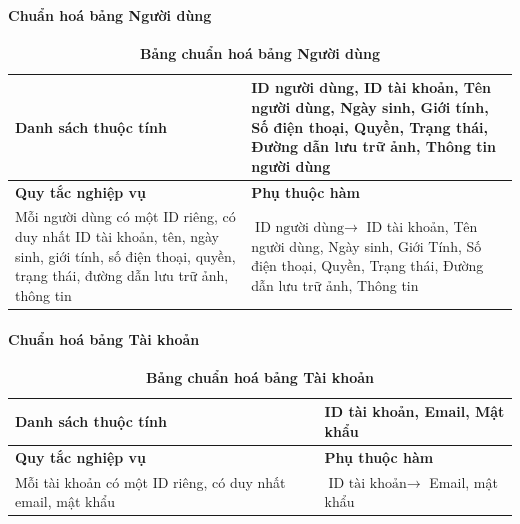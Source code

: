 \paragraph{Chuẩn hoá bảng Người dùng}
\mbox{}
\begin{table}[H]
  \caption{\bfseries \fontsize{12pt}{0pt}\selectfont Bảng chuẩn hoá bảng Người dùng}
  \centering
  \begin{tabularx}{0.9\textwidth}{|X|X|}
    \hline
    \textbf{Danh sách thuộc tính} & ID người dùng, ID tài khoản, Tên người dùng, Ngày sinh, Giới tính, Số điện thoại, Quyền, Trạng thái, Đường dẫn lưu trữ ảnh, Thông tin người dùng \\
    \hline
    \textbf{Quy tắc nghiệp vụ} & \textbf{Phụ thuộc hàm} \\
    \hline
    Mỗi người dùng có một ID riêng, có duy nhất ID tài khoản, tên, ngày sinh, giới tính, số điện thoại, quyền,
    trạng thái, đường dẫn lưu trữ ảnh, thông tin & \parbox[t]{\linewidth}{$\text{ID người dùng} \rightarrow$ ID tài khoản, Tên người dùng, Ngày sinh, Giới Tính, Số điện thoại, Quyền, Trạng thái, Đường dẫn lưu trữ ảnh, Thông tin} \\
    \hline
     \\
     \\
    \hline
  \end{tabularx}
\end{table}

\paragraph{Chuẩn hoá bảng Tài khoản}
\mbox{}
\begin{table}[H]
  \caption{\bfseries \fontsize{12pt}{0pt}\selectfont Bảng chuẩn hoá bảng Tài khoản}
  \centering
  \begin{tabularx}{0.9\textwidth}{|X|X|}
    \hline
    \textbf{Danh sách thuộc tính} & ID tài khoản, Email, Mật khẩu \\
    \hline
    \textbf{Quy tắc nghiệp vụ} & \textbf{Phụ thuộc hàm} \\
    \hline
    Mỗi tài khoản có một ID riêng, có duy nhất email, mật khẩu 
    & \parbox[t]{\linewidth}{$\text{ID tài khoản} \rightarrow$ Email, mật khẩu} \\
    \hline
     \\
     \\
    \hline
  \end{tabularx}
\end{table}

